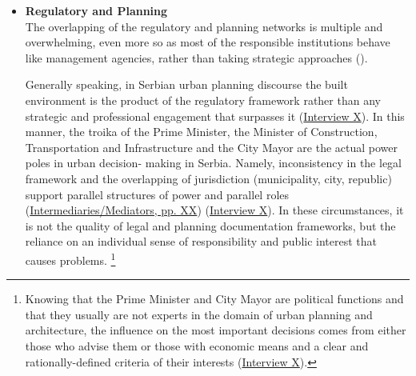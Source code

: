 \documentclass[11pt]{report}
\begin{document}
{{{{\begin{itemize}
A similar dependence on global trends and circumstances is obvious in the growing involvement of foreign investors and investments funds in real estate in Serbia. The consequences of the political treatment of property and the discrepancy between planning and implementation during socialism take its toll and are still in play through the fast-moving, profit-oriented practices under neoliberalism and transition - once built, the structures are more difficult to change, which has been the logic of BWP
\footnote{Despite the double rejection for the building permit from the Ministry of Construction, Transportation and Infrastructure, the coastal fortification was finalized during 2016. It is difficult to estimate, but, having two residential towers under construction nearby, it is very unlikely that the coastal fortification will be dismantled and removed, or even adjusted to local technical requirements.}
(\href{InterviewX}{Interview X}).
\\

\item \textbf{Regulatory and Planning}
\\
The overlapping of the regulatory and planning networks is multiple and overwhelming, even more so as most of the responsible institutions behave like management agencies, rather than taking strategic approaches  (\href{Vujosevic}{\citealt{vujosevic_collapse_2010}}).

Generally speaking, in Serbian urban planning discourse the built environment is the product of the regulatory framework rather than any strategic and professional engagement that surpasses it (\href{InterviewX}{Interview X}).
In this manner, the troika of the Prime Minister, the Minister of Construction, Transportation and Infrastructure and the City Mayor are the actual power poles in urban decision- making in Serbia. Namely, inconsistency in the legal framework and the overlapping of jurisdiction (municipality, city, republic) support parallel structures of power and parallel roles (\href{ref}{Intermediaries/Mediators, pp. XX}) (\href{InterviewX}{Interview X}).
In these circumstances, it is not the quality of legal and planning documentation frameworks, but the reliance on an individual sense of responsibility and public interest that causes problems.
\footnote{Knowing that the Prime Minister and City Mayor are political functions and that they usually are not experts in the domain of urban planning and architecture, the influence on the most important decisions comes from either those who advise them or those with economic means and a clear and rationally-defined criteria of their interests 
(\href{InterviewX}{Interview X}).}


\end{itemize}}}}}
\end{document}
